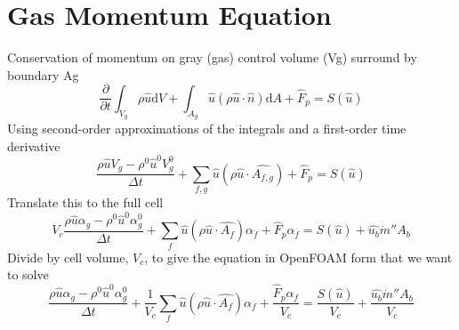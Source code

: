 \documentclass{article}
\renewcommand{\vec}[1]{\ensuremath{\hat{#1}}}
\renewcommand{\d}{\mathrm{d}}
\begin{document}
  \section{Gas Momentum Equation}
    Conservation of momentum on gray (gas) control volume (Vg) surround by boundary Ag
    \begin{equation*}
        \frac{\partial}{\partial t}\int_{V_g} \rho \vec{u} \d V 
      + \int_{A_g} \vec{u} (\rho \vec{u} \cdot \vec{n}) \d A 
      + \vec{F}_p
      = S(\vec{u})
    \end{equation*}
    Using second-order approximations of the integrals and a first-order time derivative
    \begin{equation*}
        \frac{\rho \vec{u} V_g - \rho^0 \vec{u}^0 V_g^0}{\Delta t}
      + \sum_{f,g}\vec{u} (\rho \vec{u}\cdot\vec{A_{f,g}}) 
      + \vec{F}_p
      = S(\vec{u})
    \end{equation*}
    Translate this to the full cell
    \begin{equation*}
        V_c\frac{\rho \vec{u} \alpha_g - \rho^0 \vec{u}^0 \alpha_g^0}{\Delta t}
      + \sum_{f}\vec{u} (\rho \vec{u}\cdot\vec{A_{f}})\alpha_f 
      + \vec{F}_p \alpha_f
      = S(\vec{u})
      + \vec{u_b} \dot{m}'' A_b
    \end{equation*}
    Divide by cell volume, $V_c$, to give the equation in OpenFOAM form that we want to solve
    \begin{equation}
      \label{eq:gasMom}
      \boxed{
        \frac{\rho \vec{u} \alpha_g - \rho^0 \vec{u}^0 \alpha_g^0}{\Delta t}
      + \frac{1}{V_c}\sum_{f} \vec{u} (\rho \vec{u}\cdot\vec{A_{f}})\alpha_f
      + \frac{\vec{F}_p \alpha_f}{V_c}
      = \frac{S(\vec{u})}{V_c}
      + \frac{\vec{u_b} \dot{m}'' A_b}{V_c}
      }
    \end{equation}
\end{document}
